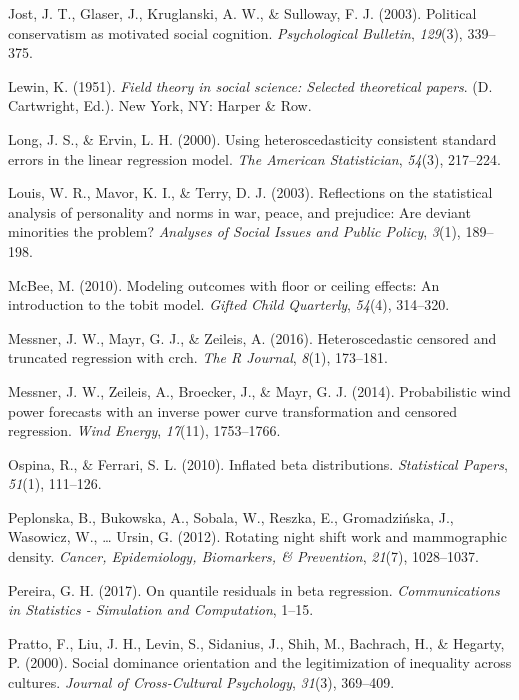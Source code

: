 \documentclass[english,man]{apa6}
\theoremstyle{definition}
\theoremstyle{definition}
\theoremstyle{remark}
\begin{document}
\hypertarget{ref-jost2003political}{}
Jost, J. T., Glaser, J., Kruglanski, A. W., \& Sulloway, F. J. (2003).
Political conservatism as motivated social cognition.
\emph{Psychological Bulletin}, \emph{129}(3), 339--375.

\hypertarget{ref-lewin1951field}{}
Lewin, K. (1951). \emph{Field theory in social science: Selected
theoretical papers}. (D. Cartwright, Ed.). New York, NY: Harper \& Row.

\hypertarget{ref-long2000using}{}
Long, J. S., \& Ervin, L. H. (2000). Using heteroscedasticity consistent
standard errors in the linear regression model. \emph{The American
Statistician}, \emph{54}(3), 217--224.

\hypertarget{ref-louis2003reflections}{}
Louis, W. R., Mavor, K. I., \& Terry, D. J. (2003). Reflections on the
statistical analysis of personality and norms in war, peace, and
prejudice: Are deviant minorities the problem? \emph{Analyses of Social
Issues and Public Policy}, \emph{3}(1), 189--198.

\hypertarget{ref-mcbee2010modeling}{}
McBee, M. (2010). Modeling outcomes with floor or ceiling effects: An
introduction to the tobit model. \emph{Gifted Child Quarterly},
\emph{54}(4), 314--320.

\hypertarget{ref-messner2016heteroscedastic}{}
Messner, J. W., Mayr, G. J., \& Zeileis, A. (2016). Heteroscedastic
censored and truncated regression with crch. \emph{The R Journal},
\emph{8}(1), 173--181.

\hypertarget{ref-messner2014probabilistic}{}
Messner, J. W., Zeileis, A., Broecker, J., \& Mayr, G. J. (2014).
Probabilistic wind power forecasts with an inverse power curve
transformation and censored regression. \emph{Wind Energy},
\emph{17}(11), 1753--1766.

\hypertarget{ref-ospina2010inflated}{}
Ospina, R., \& Ferrari, S. L. (2010). Inflated beta distributions.
\emph{Statistical Papers}, \emph{51}(1), 111--126.

\hypertarget{ref-peplonska2012rotating}{}
Peplonska, B., Bukowska, A., Sobala, W., Reszka, E., Gromadzińska, J.,
Wasowicz, W., \ldots{} Ursin, G. (2012). Rotating night shift work and
mammographic density. \emph{Cancer, Epidemiology, Biomarkers, \&
Prevention}, \emph{21}(7), 1028--1037.

\hypertarget{ref-pereira2017quantile}{}
Pereira, G. H. (2017). On quantile residuals in beta regression.
\emph{Communications in Statistics - Simulation and Computation}, 1--15.

\hypertarget{ref-pratto2000social}{}
Pratto, F., Liu, J. H., Levin, S., Sidanius, J., Shih, M., Bachrach, H.,
\& Hegarty, P. (2000). Social dominance orientation and the
legitimization of inequality across cultures. \emph{Journal of
Cross-Cultural Psychology}, \emph{31}(3), 369--409.
\end{document}
